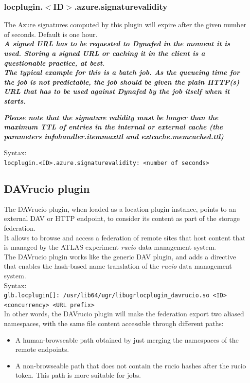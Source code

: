\documentclass[12pt]{article} %
\begin{document}
\subsubsection{locplugin.$<$ID$>$.azure.signaturevalidity}
The Azure signatures computed by this plugin will expire after the given number of seconds. Default is one hour.\\

\textit{\textbf{A signed URL has to be requested to Dynafed in the moment it is used. Storing a signed URL or caching it in the client
is a questionable practice, at best.\\
The typical example for this is a batch job. As the queueing time for the job is not predictable, the job should
be given the plain HTTP(s) URL that has to be used against Dynafed by the job itself when it starts.\\}}

\textit{\textbf{Please note that the signature validity must be longer than the maximum TTL of entries in the internal or
external cache (the parameters infohandler.itemmaxttl and extcache.memcached.ttl)\\}}

Syntax:\\
\lstinline"locplugin.<ID>.azure.signaturevalidity: <number of seconds>"\\





\subsection{DAVrucio plugin}
The DAVrucio plugin, when loaded as a location plugin instance, points to an external DAV or HTTP endpoint, to consider its content as part of the storage federation.\\
It allows to browse and access a federation of remote sites that host content that is managed by the ATLAS experiment \textit{rucio} data management system.\\
The DAVrucio plugin works like the generic DAV plugin, and adds a directive that enables the hash-based name translation of the \textit{rucio} data management system.\\

Syntax:\\
\lstinline"glb.locplugin[]: /usr/lib64/ugr/libugrlocplugin_davrucio.so <ID> <concurrency> <URL prefix>"\\

In other words, the DAVrucio plugin will make the federation export two aliased namespaces, with the same file content accessible through different paths:
\begin{itemize}
 \item A human-browseable path obtained by just merging the namespaces of the remote endpoints.
 \item A non-browseable path that does not contain the rucio hashes after the rucio token. This path is more suitable for jobs.
\end{itemize}
\end{document}
